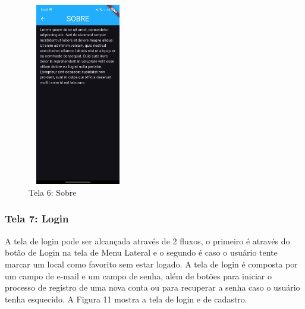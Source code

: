     \begin{figure}[h]
        \centering
        \includegraphics[width=44mm,height=80mm]{imagens/sobre.jpg}
        \caption{\scriptsize Tela 6: Sobre}
        \footnotesize  {}
        \label{fig:tela6}
    \end{figure}

    \FloatBarrier

\subsubsection{Tela 7: Login}

    A tela de login pode ser alcançada através de 2 fluxos, o primeiro é através do botão de Login na tela de Menu Lateral e o segundo é caso o usuário tente marcar um local como favorito sem estar logado. A tela de login é composta por um campo de e-mail e um campo de senha, além de botões para iniciar o processo de registro de uma nova conta ou para recuperar a senha caso o usuário tenha esquecido. A Figura 11 mostra a tela de login e de cadastro.

